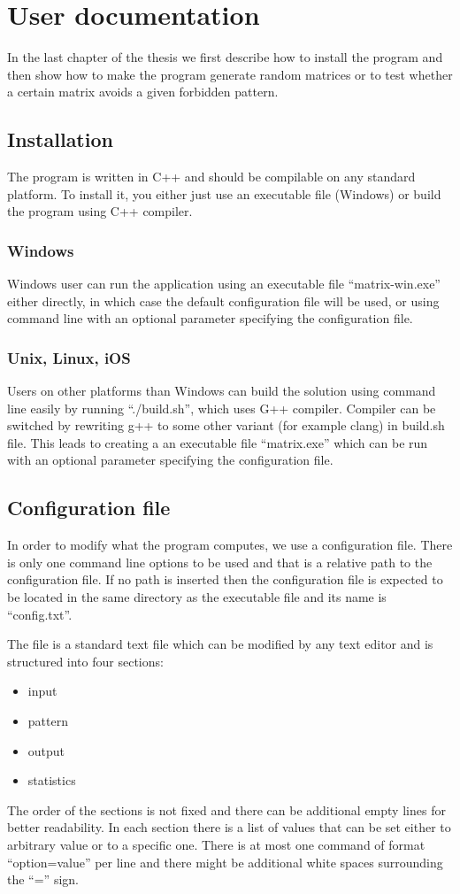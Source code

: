 \chapter{User documentation}
\label{chap:udoc}
In the last chapter of the thesis we first describe how to install the program and then show how to make the program generate random matrices or to test whether a certain matrix avoids a given forbidden pattern.

\section{Installation}
The program is written in C++ and should be compilable on any standard platform. To install it, you either just use an executable file (Windows) or build the program using C++ compiler.

\subsection{Windows}
Windows user can run the application using an executable file ``matrix-win.exe'' either directly, in which case the default configuration file will be used, or using command line with an optional parameter specifying the configuration file.

\subsection{Unix, Linux, iOS}
Users on other platforms than Windows can build the solution using command line easily by running ``./build.sh'', which uses G++ compiler. Compiler can be switched by rewriting g++ to some other variant (for example clang) in build.sh file. This leads to creating a an executable file ``matrix.exe'' which can be run with an optional parameter specifying the configuration file.

\section{Configuration file}
In order to modify what the program computes, we use a configuration file. There is only one command line options to be used and that is a relative path to the configuration file. If no path is inserted then the configuration file is expected to be located in the same directory as the executable file and its name is ``config.txt''.

The file is a standard text file which can be modified by any text editor and is structured into four sections:
\begin{itemize}
\item input
\item pattern
\item output
\item statistics
\end{itemize}
The order of the sections is not fixed and there can be additional empty lines for better readability. In each section there is a list of values that can be set either to arbitrary value or to a specific one. There is at most one command of format ``option=value'' per line and there might be additional white spaces surrounding the ``='' sign.

